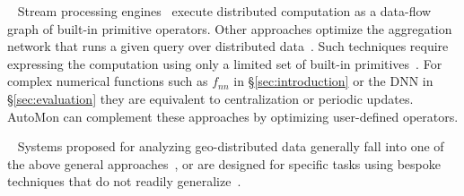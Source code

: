 ~
Stream processing engines~\cite{flink,spark} execute distributed computation as a data-flow graph of built-in primitive operators.
Other approaches optimize the aggregation network that runs a given query over distributed data~\cite{2018_sonata,mortazavi2020feather,nemo}.
%
Such techniques require expressing the computation using only a limited set of built-in primitives~\cite{2019_yu_network_telemetry}.
For complex numerical functions such as $f_{nn}$ in \S\ref{sec:introduction} or the DNN in \S\ref{sec:evaluation} they are equivalent to centralization or periodic updates.
AutoMon can complement these approaches by optimizing user-defined operators.

~
Systems proposed for analyzing geo-distributed data generally fall into one of the above general approaches~\cite{wanalytics,pixida,mortazavi2020feather,tiwari2019reconfigurable}, or are designed for specific tasks using bespoke techniques that do not readily generalize~\cite{gaia,kang2017neurosurgeon,iridium}.
